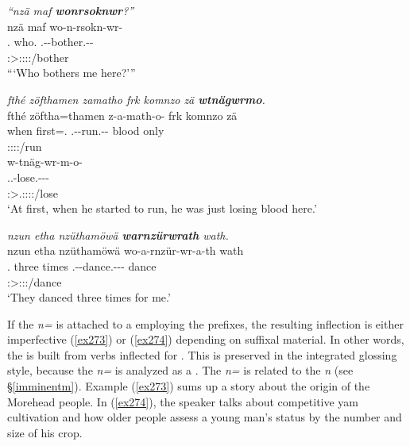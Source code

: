 \begin{exe}
	\ex \emph{``nzä maf \textbf{wonrsoknwr}?''}\\
	\glll nzä maf wo-n-rsokn-wr-\Zero{}\\
	\Fsg.\Abs{} who.\Erg{} \Fsg.\Alph-\Venit-bother.\Ext-\Ndu-\Stsg{}\\
	{} {} \footnotesize{\Stsg:\Sbj>\Fsg:\Obj:\Nonpast:\Ipfv:\Venit/bother}\\
	\trans ```Who bothers me here?'''
	\label{ex276}
\end{exe}
\begin{exe}
	\ex \emph{fthé zöfthamen zamatho frk komnzo zä \textbf{wtnägwrmo}.}\\
	\glll fthé zöftha=thamen z-a-math-o-\Zero{} frk komnzo zä\\
	when first=\Temp.\Loc{} \M.\Gam-\Ndu-run.\Rs-\Andat-\Stsg{} blood only \Prox{}\\
	{} {} \footnotesize{\Stsg:\Sbj:\Rpst:\Pfv:\Andat/run} {} {} {}\\
	\sn
	\glll w-tnäg-wr-m-o-\Zero\\
	\Tsg.\F.\Alph-lose.\Ext-\Ndu-\Dur-\Andat{}\\
	\footnotesize{\Sg:\Sbj>\Tsg.\F:\Obj:\Rpst:\Dur:\Andat/lose}\\
	\trans `At first, when he started to run, he was just losing blood here.'\\
	\label{ex275}
\end{exe}
\begin{exe}
	\ex \emph{nzun etha nzüthamöwä \textbf{warnzürwrath} wath.}\\
	\glll nzun etha nzüthamöwä wo-a-rnzür-wr-a-th wath\\
	\Fsg.\Dat{} three times \Fsg.\Alph-\Vc-dance.\Ext-\Ndu-\Pst-\Stnsg{} dance\\
	{} {} {} \footnotesize{\Stpl:\Sbj>\Fsg:\Io:\Pst:\Ipfv/dance} {}\\
	\trans `They danced three times for me.'\\
	\label{ex277}
\end{exe}

If the  \emph{n=} is attached to a  employing the \Alph{} prefixes, the resulting inflection is either  imperfective (\ref{ex273}) or   (\ref{ex274}) depending on suffixal material. In other words, the  is built from verbs inflected for . This is preserved in the integrated glossing style, because the \emph{n=} is analyzed as a . The \emph{n=} is related to the   \emph{n} (see \S{}\ref{imminentm}). Example (\ref{ex273}) sums up a story about the origin of the Morehead people. In (\ref{ex274}), the speaker talks about competitive yam cultivation and how older people assess a young man's status by the number and size of his crop.

